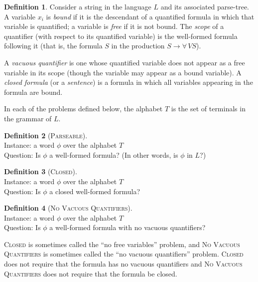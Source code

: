\documentclass{article}
\theoremstyle{remark} \newtheorem{technicality}{Technical note}
\theoremstyle{definition} \newtheorem{definition}{Definition}
\theoremstyle{definition} \newtheorem{openproblem}{Open problem}
\newcommand{\yields}{\rightarrow}
\newcommand{\CLOSED}{\textsc{Closed}}
\newcommand{\PARSEABLE}{\textsc{Parseable}}
\newcommand{\NVQ}{\textsc{No Vacuous Quantifiers}}
\newenvironment{langdef}[1]{\begin{definition}[#1]\mbox{}}{\end{definition}}
\newenvironment{instance}{\\Instance:}{}
\newenvironment{question}{\\Question:}{}
\begin{document}
\begin{definition}
  Consider a string in the language $L$ and its associated parse-tree.
  A variable $x_i$ is \emph{bound} if it is the descendant of a quantified formula in which that variable is quantified; a variable is \emph{free} if it is not bound.
  The \emph{scope} of a quantifier (with respect to its quantified variable) is the well-formed formula following it (that is, the formula $S$ in the production $S \yields \forall \, V S$).

  A \emph{vacuous quantifier} is one whose quantified variable does not appear as a free variable in its scope (though the variable may appear as a bound variable).
  A \emph{closed formula} (or a \emph{sentence}) is a formula in which all variables appearing in the formula are bound.
\end{definition}

In each of the problems defined below, the alphabet $T$ is the set of terminals in the grammar of $L$.
\begin{langdef}{\PARSEABLE}
  \begin{instance}
    a word $\phi$ over the alphabet $T$
  \end{instance}
  \begin{question}
    Is $\phi$ a well-formed formula?
    (In other words, is $\phi$ in $L$?)
  \end{question}
\end{langdef}

\begin{langdef}{\CLOSED}
  \begin{instance}
    a word $\phi$ over the alphabet $T$
  \end{instance}
  \begin{question}
    Is $\phi$ a closed well-formed formula?
  \end{question}
\end{langdef}

\begin{langdef}{\NVQ}
  \begin{instance}
    a word $\phi$ over the alphabet $T$
  \end{instance}
  \begin{question}
    Is $\phi$ a well-formed formula with no vacuous quantifiers?
  \end{question}
\end{langdef}

\CLOSED{} is sometimes called the ``no free variables'' problem, and \NVQ{} is sometimes called the ``no vacuous quantifiers'' problem.
\CLOSED{} does not require that the formula has no vacuous quantifiers and \NVQ{} does not require that the formula be closed.
\end{document}

